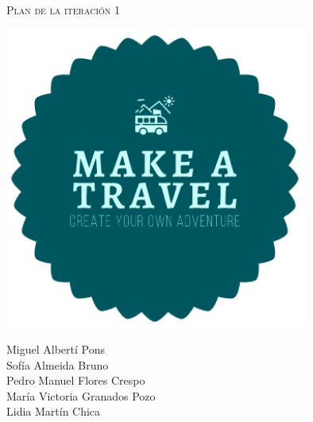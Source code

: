 \documentclass[11pt]{article}
\begin{document}
\begin{titlepage}
\centering
\vspace{4.5cm}
{\scshape\LARGE Plan de la iteración 1\par}
\vspace{1.5cm}

\includegraphics[width=10cm] {Logo}

\vspace{3cm}
{\scshape\large \par}
\vspace{1cm}

{Miguel Albertí Pons\\
Sofía Almeida Bruno\\
Pedro Manuel Flores Crespo\\
María Victoria Granados Pozo\\
Lidia Martín Chica
\par}

\end{titlepage}

\newpage
\end{document}
